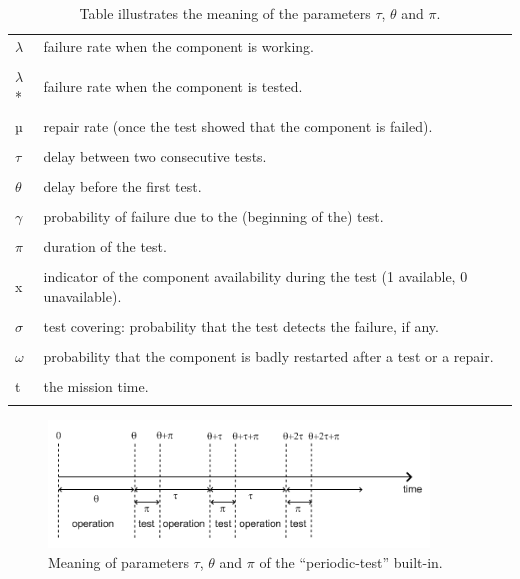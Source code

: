 \documentclass[11pt]{article}
\begin{document}
\begin{table}[htbp]
\caption{Table illustrates the meaning of the parameters \(\tau\), \(\theta\) and \(\pi\). \label{FigureV-15}}
\centering
\begin{tabular}{ll}
\(\lambda\) & failure rate when the component is working.\\
 & \\
\(\lambda\)* & failure rate when the component is tested.\\
 & \\
µ & repair rate (once the test showed that the component is failed).\\
 & \\
\(\tau\) & delay between two consecutive tests.\\
 & \\
\(\theta\) & delay before the first test.\\
 & \\
\(\gamma\) & probability of failure due to the (beginning of the) test.\\
 & \\
\(\pi\) & duration of the test.\\
 & \\
x & indicator of the component availability during the test (1 available, 0 unavailable).\\
 & \\
\(\sigma\) & test covering: probability that the test detects the failure, if any.\\
 & \\
\(\omega\) & probability that the component is badly restarted after a test or a repair.\\
 & \\
t & the mission time.\\
 & \\
\end{tabular}
\end{table}





\begin{figure}[htbp]

\includegraphics[width=0.9\textwidth]{./word/media/image7.png}
\caption{\label{fig:orgc941764}
Meaning of parameters \(\tau\), \(\theta\) and \(\pi\) of the ``periodic-test'' built-in.}
\end{figure}
\end{document}
